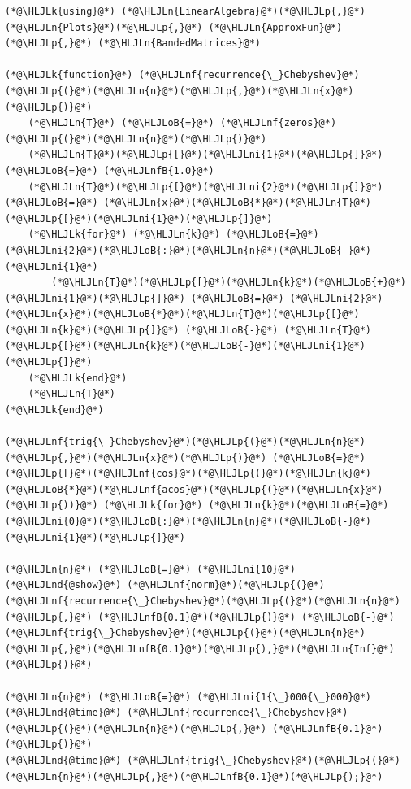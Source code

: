 \documentclass[12pt,a4paper]{article}
\newcommand{\HLJLk}[1]{\textcolor[RGB]{148,91,176}{\textbf{#1}}}
\newcommand{\HLJLn}[1]{#1}
\newcommand{\HLJLnd}[1]{\textcolor[RGB]{214,102,97}{#1}}
\newcommand{\HLJLnf}[1]{\textcolor[RGB]{66,102,213}{#1}}
\newcommand{\HLJLnfB}[1]{\textcolor[RGB]{59,151,46}{#1}}
\newcommand{\HLJLni}[1]{\textcolor[RGB]{59,151,46}{#1}}
\newcommand{\HLJLoB}[1]{\textcolor[RGB]{102,102,102}{\textbf{#1}}}
\newcommand{\HLJLp}[1]{#1}
\begin{document}
\begin{lstlisting}
(*@\HLJLk{using}@*) (*@\HLJLn{LinearAlgebra}@*)(*@\HLJLp{,}@*) (*@\HLJLn{Plots}@*)(*@\HLJLp{,}@*) (*@\HLJLn{ApproxFun}@*)(*@\HLJLp{,}@*) (*@\HLJLn{BandedMatrices}@*)

(*@\HLJLk{function}@*) (*@\HLJLnf{recurrence{\_}Chebyshev}@*)(*@\HLJLp{(}@*)(*@\HLJLn{n}@*)(*@\HLJLp{,}@*)(*@\HLJLn{x}@*)(*@\HLJLp{)}@*)
    (*@\HLJLn{T}@*) (*@\HLJLoB{=}@*) (*@\HLJLnf{zeros}@*)(*@\HLJLp{(}@*)(*@\HLJLn{n}@*)(*@\HLJLp{)}@*)
    (*@\HLJLn{T}@*)(*@\HLJLp{[}@*)(*@\HLJLni{1}@*)(*@\HLJLp{]}@*) (*@\HLJLoB{=}@*) (*@\HLJLnfB{1.0}@*)
    (*@\HLJLn{T}@*)(*@\HLJLp{[}@*)(*@\HLJLni{2}@*)(*@\HLJLp{]}@*) (*@\HLJLoB{=}@*) (*@\HLJLn{x}@*)(*@\HLJLoB{*}@*)(*@\HLJLn{T}@*)(*@\HLJLp{[}@*)(*@\HLJLni{1}@*)(*@\HLJLp{]}@*)
    (*@\HLJLk{for}@*) (*@\HLJLn{k}@*) (*@\HLJLoB{=}@*) (*@\HLJLni{2}@*)(*@\HLJLoB{:}@*)(*@\HLJLn{n}@*)(*@\HLJLoB{-}@*)(*@\HLJLni{1}@*)
        (*@\HLJLn{T}@*)(*@\HLJLp{[}@*)(*@\HLJLn{k}@*)(*@\HLJLoB{+}@*)(*@\HLJLni{1}@*)(*@\HLJLp{]}@*) (*@\HLJLoB{=}@*) (*@\HLJLni{2}@*)(*@\HLJLn{x}@*)(*@\HLJLoB{*}@*)(*@\HLJLn{T}@*)(*@\HLJLp{[}@*)(*@\HLJLn{k}@*)(*@\HLJLp{]}@*) (*@\HLJLoB{-}@*) (*@\HLJLn{T}@*)(*@\HLJLp{[}@*)(*@\HLJLn{k}@*)(*@\HLJLoB{-}@*)(*@\HLJLni{1}@*)(*@\HLJLp{]}@*)
    (*@\HLJLk{end}@*)
    (*@\HLJLn{T}@*)
(*@\HLJLk{end}@*)

(*@\HLJLnf{trig{\_}Chebyshev}@*)(*@\HLJLp{(}@*)(*@\HLJLn{n}@*)(*@\HLJLp{,}@*)(*@\HLJLn{x}@*)(*@\HLJLp{)}@*) (*@\HLJLoB{=}@*) (*@\HLJLp{[}@*)(*@\HLJLnf{cos}@*)(*@\HLJLp{(}@*)(*@\HLJLn{k}@*)(*@\HLJLoB{*}@*)(*@\HLJLnf{acos}@*)(*@\HLJLp{(}@*)(*@\HLJLn{x}@*)(*@\HLJLp{))}@*) (*@\HLJLk{for}@*) (*@\HLJLn{k}@*)(*@\HLJLoB{=}@*)(*@\HLJLni{0}@*)(*@\HLJLoB{:}@*)(*@\HLJLn{n}@*)(*@\HLJLoB{-}@*)(*@\HLJLni{1}@*)(*@\HLJLp{]}@*)

(*@\HLJLn{n}@*) (*@\HLJLoB{=}@*) (*@\HLJLni{10}@*)
(*@\HLJLnd{@show}@*) (*@\HLJLnf{norm}@*)(*@\HLJLp{(}@*)(*@\HLJLnf{recurrence{\_}Chebyshev}@*)(*@\HLJLp{(}@*)(*@\HLJLn{n}@*)(*@\HLJLp{,}@*) (*@\HLJLnfB{0.1}@*)(*@\HLJLp{)}@*) (*@\HLJLoB{-}@*) (*@\HLJLnf{trig{\_}Chebyshev}@*)(*@\HLJLp{(}@*)(*@\HLJLn{n}@*)(*@\HLJLp{,}@*)(*@\HLJLnfB{0.1}@*)(*@\HLJLp{),}@*)(*@\HLJLn{Inf}@*)(*@\HLJLp{)}@*)

(*@\HLJLn{n}@*) (*@\HLJLoB{=}@*) (*@\HLJLni{1{\_}000{\_}000}@*)
(*@\HLJLnd{@time}@*) (*@\HLJLnf{recurrence{\_}Chebyshev}@*)(*@\HLJLp{(}@*)(*@\HLJLn{n}@*)(*@\HLJLp{,}@*) (*@\HLJLnfB{0.1}@*)(*@\HLJLp{)}@*)
(*@\HLJLnd{@time}@*) (*@\HLJLnf{trig{\_}Chebyshev}@*)(*@\HLJLp{(}@*)(*@\HLJLn{n}@*)(*@\HLJLp{,}@*)(*@\HLJLnfB{0.1}@*)(*@\HLJLp{);}@*)
\end{lstlisting}
\end{document}
